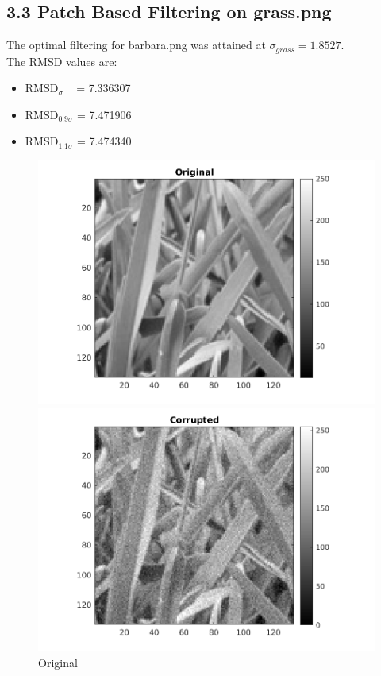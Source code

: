 \documentclass[12pt, a4paper]{article}
\begin{document}
\subsection*{3.3 Patch Based Filtering on grass.png}
\noindent The optimal filtering for barbara.png was attained at $\sigma_{grass} = 1.8527$. \\
The RMSD values are:
\begin{itemize}
	\item RMSD$_{\sigma}\;\;\;$  = 7.336307
	\item RMSD$_{0.9\sigma}$ = 7.471906
	\item RMSD$_{1.1\sigma}$ = 7.474340
\end{itemize}
\begin{figure}[h]
    \centering
    \renewcommand{\thefigure}{3.3(a)}
    \begin{minipage}[c][1\width]{0.3\textwidth}
    	\hspace*{-1in}
    	\includegraphics[width=1.5\textwidth]{grass_original.png}
    	\caption{Original}
	    \label{fig:3.3(a)}
    \end{minipage}
    \renewcommand{\thefigure}{3.3(b)}
    \begin{minipage}[c][1\width]{0.3\textwidth}
    	\hspace*{-0.5in}
    	\includegraphics[width=1.5\textwidth]{grass_corrupted.png}

\end{minipage}
\end{figure}
\end{document}
